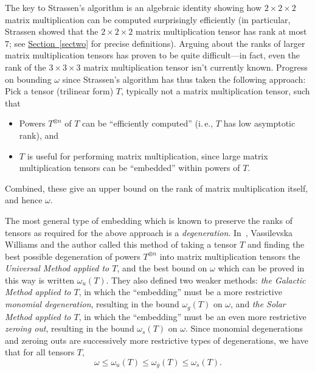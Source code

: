 \documentclass[11pt]{article}
\numberwithin{equation}{section}
\theoremstyle{definition}
\theoremstyle{plain}
\newcommand{\ie}{i.\,e.}
\newcommand{\expref}[2]{\hyperref[#2]{#1~\ref{#2}}}
\theoremstyle{definition}
\begin{document}
The key to Strassen's algorithm is an algebraic identity showing how $2 \times 2 \times 2$ matrix multiplication can be computed surprisingly efficiently (in particular, Strassen showed that the $2 \times 2 \times 2$ matrix multiplication tensor has rank at most $7$; see \expref{Section}{sectwo} for precise definitions). Arguing about the ranks of larger matrix multiplication tensors has proven to be quite difficult---in fact, even the rank of the $3 \times 3 \times 3$ matrix multiplication tensor isn't currently known. Progress on bounding $\omega$ since Strassen's algorithm has thus taken the following approach: Pick a tensor (trilinear form) $T$, typically not a matrix multiplication tensor, such that
\begin{itemize}
    \item Powers $T^{\otimes n}$ of $T$ can be ``efficiently computed'' (\ie, $T$ has low asymptotic rank), and
    \item $T$ is useful for performing matrix multiplication, since large matrix multiplication tensors can be ``embedded'' within powers of $T$.
\end{itemize}
Combined, these give an upper bound on the rank of matrix multiplication itself, and hence $\omega$.

The most general type of embedding which is known to preserve the ranks of tensors as required for the above approach is a \emph{degeneration}. In~\cite{aw}, %
Vassilevska Williams and the author %
 called this method of taking a tensor $T$ and finding the best possible degeneration of powers $T^{\otimes n}$ into matrix multiplication tensors the \emph{Universal Method applied to $T$}, and the best bound on $\omega$ which can be proved in this way is written $\omega_u(T)$. They also defined two weaker methods: \emph{the Galactic Method applied to $T$}, in which the ``embedding'' must be a more restrictive \emph{monomial degeneration}, resulting in the bound $\omega_g(T)$ on $\omega$, and \emph{the Solar Method applied to $T$}, in which the ``embedding'' must be an even more restrictive \emph{zeroing out}, resulting in the bound $\omega_s(T)$ on $\omega$. Since monomial degenerations and zeroing outs are successively more restrictive types of degenerations, we have that for all tensors $T$, $$\omega \leq \omega_u(T) \leq \omega_g(T) \leq \omega_s(T).$$
\end{document}
